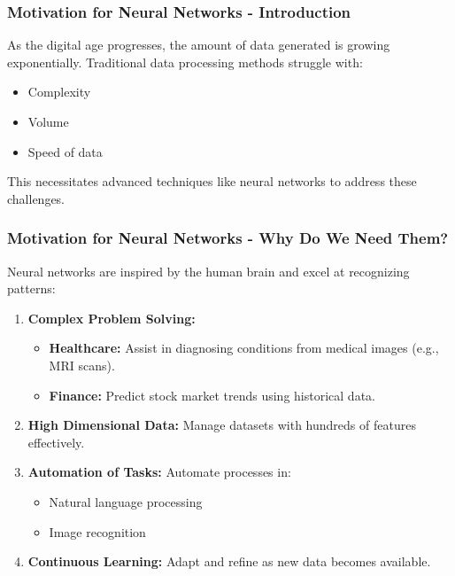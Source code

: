 \documentclass[aspectratio=169]{beamer}
\begin{document}
\begin{frame}[fragile]
    \frametitle{Motivation for Neural Networks - Introduction}
    As the digital age progresses, the amount of data generated is growing exponentially. 
    Traditional data processing methods struggle with:
    \begin{itemize}
        \item Complexity
        \item Volume
        \item Speed of data
    \end{itemize}
    This necessitates advanced techniques like neural networks to address these challenges.
\end{frame}

\begin{frame}[fragile]
    \frametitle{Motivation for Neural Networks - Why Do We Need Them?}
    Neural networks are inspired by the human brain and excel at recognizing patterns:
    \begin{enumerate}
        \item \textbf{Complex Problem Solving:}
            \begin{itemize}
                \item \textbf{Healthcare:} Assist in diagnosing conditions from medical images (e.g., MRI scans).
                \item \textbf{Finance:} Predict stock market trends using historical data.
            \end{itemize}
        \item \textbf{High Dimensional Data:} Manage datasets with hundreds of features effectively.
        \item \textbf{Automation of Tasks:} Automate processes in:
            \begin{itemize}
                \item Natural language processing
                \item Image recognition
            \end{itemize}
        \item \textbf{Continuous Learning:} Adapt and refine as new data becomes available.
    \end{enumerate}
\end{frame}
\end{document}
